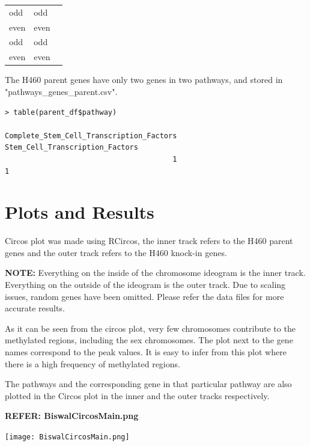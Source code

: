 \documentclass[11pt]{article}
\begin{document}
\begin{center}

\begin{tabular}{lll}
odd     & odd  \\
even    & even \\
odd     & odd  \\
even    & even \\
\end{tabular}
\end{center}

The H460 parent genes have only two genes in two pathways, and stored in "pathways\_genes\_parent.csv".

\begin{verbatim}
> table(parent_df$pathway)

Complete_Stem_Cell_Transcription_Factors          Stem_Cell_Transcription_Factors 
                                       1                                        1 
\end{verbatim}

\section*{Plots and Results}

Circos plot was made using RCircos, the inner track refers to the H460 parent genes and the outer track refers to the H460 knock-in genes.

{\bf NOTE:} Everything on the inside of the chromosome ideogram is the inner track. Everything on the outside of the ideogram is the outer track. Due to scaling issues, random genes have been omitted. Please refer the data files for more accurate results.

As it can be seen from the circos plot, very few chromosomes contribute to the methylated regions, including the sex chromosomes. The plot next to the gene names correspond to the peak values. It is easy to infer from this plot where there is a high frequency of methylated regions.

The pathways and the corresponding gene in that particular pathway are also plotted in the Circos plot in the inner and the outer tracks respectively.

{\bf REFER: BiswalCircosMain.png}


\texttt{[image: BiswalCircosMain.png]}



% 
 
\end{document}

